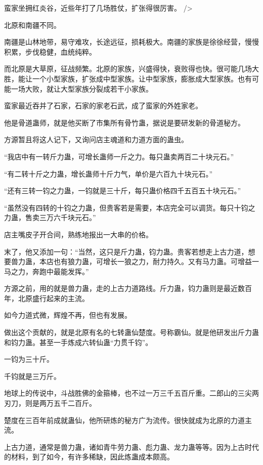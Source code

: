 
\begin{this_body}

蛮家坐拥红炎谷，近些年打了几场胜仗，扩张得很厉害。 />

北原和南疆不同。

南疆是山林地带，易守难攻，长途远征，损耗极大。南疆的家族是徐徐经营，慢慢积累，步伐稳健，血统纯粹。

而北原是大草原，征战频繁。北原的家族，兴盛得快，衰败得也快。很可能几场大胜，能让一个小型家族，扩张成中型家族。让中型家族，膨胀成大型家族。也有可能一场大败，就让大型家族分裂成若干小家族。

蛮家最近吞并了石家，石家的家老石武，成了蛮家的外姓家老。

他是骨道蛊师，就是他买断了市集所有骨竹蛊，据说是要研发新的骨道秘方。

方源暂且将这人记下，又询问店主魂道和力道方面的蛊虫。

“我店中有一转斤力蛊，可增长蛊师一斤之力。每只蛊卖两百二十块元石。”

“有二转十斤之力蛊，增长蛊师十斤力气，单价是六百九十块元石。”

“还有三转一钧之力蛊，一钧就是三十斤，每只蛊价格四千五百五十块元石。”

“虽然没有四转的十钧之力蛊，但贵客若是需要，本店完全可以调货。每只十钧之力蛊，售卖三万六千块元石。”

店主嘴皮子开合间，熟练地报出一大串的价格。

末了，他又添加一句：“当然，这只是斤力蛊，钧力蛊。贵客若想走上古力道，想要兽力蛊，本店也有狼力蛊，可增长一狼之力，耐力持久。又有马力蛊。可增益一马之力，奔跑中最能发挥。”

方源之前，用的就是兽力蛊，走的上古力道路线。斤力蛊，钧力蛊则是最近数百年，北原盛行起来的主流。

如今力道式微，辉煌不再，但也有发展。

做出这个贡献的，就是北原有名的七转蛊仙楚度。号称霸仙。就是他研发出斤力蛊和钧力蛊。甚至一手炼成六转仙蛊“力贯千钧”。

一钧为三十斤。

千钧就是三万斤。

地球上的传说中，斗战胜佛的金箍棒，也不过一万三千五百斤重。二郎山的三尖两刃刀，则是两万五千二百斤。

楚度在三百年前成就蛊仙，他所研炼的秘方广为流传。很快就成为北原的力道主流。

上古力道，通常是兽力蛊，诸如青牛劳力蛊、彪力蛊、龙力蛊等等。因为上古时代的材料，到了如今，有许多稀缺，因此炼蛊成本颇高。


\end{this_body}
